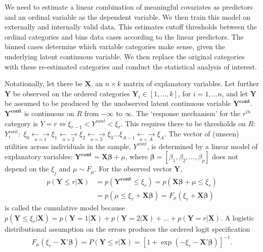 \documentclass[12pt,econ]{sources/authesis}
\begin{document}
\vspace{-0.4cm}

We need to estimate a linear combination of meaningful covariates as predictors and an ordinal variable as the dependent variable. We then train this model on externally and internally valid data. This estimates cutoff thresholds between the ordinal categories and bins data cases according to the linear predictors. The binned cases determine which variable categories make sense, given the underlying latent continuous variable. We then replace the original categories with these re-estimated categories and conduct the statistical analysis of interest.

Notationally, let there be \(\bm{X}\), an \(n \times k\) matrix of explanatory variables. Let further \(\bm{Y}\) be observed on the ordered categories \(\bm{Y}_i \in [1,\ldots,k]\), for \(i=1,\ldots n\), and let \(\bm{Y}\) be assumed to be produced by the unobserved latent continuous variable \(\bm{Y^{cont}}\). \(\bm{Y^{cont}}\) is continuous on \(R\) from \(-\infty\) to \(\infty\). The `response mechanism' for the \(r^{th}\) category is \(Y=r \Longleftrightarrow \xi_{r-1} < Y^{cont} < \xi_r\). This requires there to be thresholds on \(R\):
\(Y^{cont}_i: \; \xi_0 \underset{a=1}{\longleftarrow\!\longrightarrow} \xi_1 \underset{a=2}{\longleftarrow\!\longrightarrow} \xi_2 \underset{a=3}{\longleftarrow\!\longrightarrow} \xi_3\ldots \xi_{A-1} \underset{a=A}{\longleftarrow\!\longrightarrow} \xi_A\). The vector of (unseen) utilities across individuals in the sample, \(Y^{cont}\), is determined by a linear model of explanatory variables: \(\bm{Y^{cont}} = \bm{X} \bm{\beta} + \mu\), where \(\bm{\beta} =[\beta_1,\beta_2,\ldots,\beta_p]\) does not depend on the \(\xi_j\) and \(\mu \sim F_{\mu}\). For the observed vector \(\bm{Y}\),
\begin{align}
p(\bm{Y} \leq r|\bm{X}) &= p(\bm{Y^{cont}} \leq \xi_r) = p(\bm{X}\bm{\beta} + \mu \leq \xi_r) \nonumber\\
&= p(\mu \leq \xi_r+\bm{X}\bm{\beta}) = F_{\mu}(\xi_r + \bm{X}\bm{\beta})
\end{align}
is called the cumulative model because \(p(\bm{Y} \leq \xi_r|\bm{X}) = p(\bm{Y}=1|\bm{X}) + p(\bm{Y}=2|\bm{X}) + \ldots + p(\bm{Y}=r|\bm{X})\). A logistic distributional assumption on the errors produces the ordered logit specification
\begin{align}
F_{\mu}(\xi_r - \bm{X}'\bm{\beta}) = P(\bm{Y} \leq r|\bm{X}) = [1+\exp(-\xi_r-\bm{X}'\bm{\beta})]^{-1}. 
\end{align}
\end{document}
